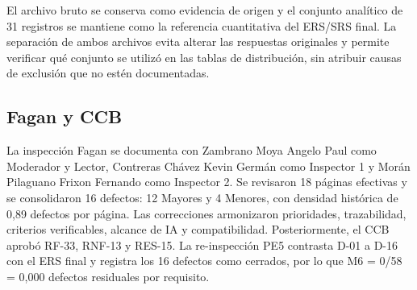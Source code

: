 \documentclass[12pt,a4paper]{article}
\begin{document}
El archivo bruto se conserva como evidencia de origen y el conjunto analítico de 31 registros se mantiene como la referencia cuantitativa del ERS/SRS final. La separación de ambos archivos evita alterar las respuestas originales y permite verificar qué conjunto se utilizó en las tablas de distribución, sin atribuir causas de exclusión que no estén documentadas.

\subsection{Fagan y CCB}
La inspección Fagan se documenta con Zambrano Moya Angelo Paul como Moderador y Lector, Contreras Chávez Kevin Germán como Inspector 1 y Morán Pilaguano Frixon Fernando como Inspector 2. Se revisaron 18 páginas efectivas y se consolidaron 16 defectos: 12 Mayores y 4 Menores, con densidad histórica de 0,89 defectos por página. Las correcciones armonizaron prioridades, trazabilidad, criterios verificables, alcance de IA y compatibilidad. Posteriormente, el CCB aprobó RF-33, RNF-13 y RES-15. La re-inspección PE5 contrasta D-01 a D-16 con el ERS final y registra los 16 defectos como cerrados, por lo que M6 = 0/58 = 0,000 defectos residuales por requisito.
\end{document}
